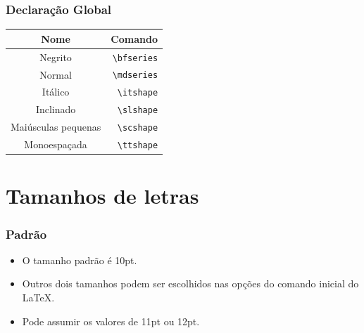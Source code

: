 \documentclass{beamer}
\begin{document}
\begin{frame}[fragile]
    \frametitle{Declaração Global}

    \begin{table}[h]
        \begin{tabular}{c|r}
            Nome & Comando \\ \hline 
            Negrito & \lstinline[style=myStyleLatex]!\bfseries! \\ \hline 
            Normal & \lstinline[style=myStyleLatex]!\mdseries! \\ \hline 
            Itálico & \lstinline[style=myStyleLatex]!\itshape! \\ \hline 
            Inclinado & \lstinline[style=myStyleLatex]!\slshape! \\ \hline
            Maiúsculas pequenas & \lstinline[style=myStyleLatex]!\scshape! \\ \hline
            Monoespaçada & \lstinline[style=myStyleLatex]!\ttshape! \\ \hline
        \end{tabular}
    \end{table}

\end{frame}

\section{Tamanhos de letras}

\begin{frame}[fragile]
    \frametitle{Padrão}

    \begin{itemize}
        \item O tamanho padrão é 10pt.
        \item Outros dois tamanhos podem ser escolhidos nas opções do comando inicial do \LaTeX. 
        \item Pode assumir os valores de 11pt ou 12pt.
    \end{itemize}

\end{frame}
\end{document}
